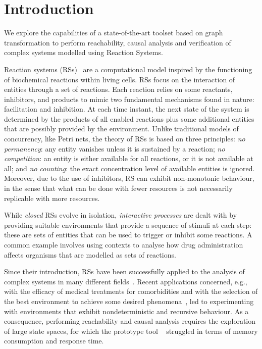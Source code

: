 
\section{Introduction}

We explore the capabilities of a state-of-the-art toolset based on graph transformation to perform reachability, causal analysis and verification of complex systems modelled using Reaction Systems.

Reaction systems (RSs)~\cite{DBLP:journals/fuin/EhrenfeuchtR07} are a computational model inspired by the functioning of biochemical reactions within living cells. 
RSs focus on the interaction of entities through a set of reactions. 
Each reaction relies on some reactants, inhibitors, and products to mimic two fundamental mechanisms found in nature: facilitation and inhibition.
At each time instant, the next state of the system is determined by the products of all enabled reactions plus some additional entities that are possibly provided by the environment.
Unlike traditional models of concurrency, like Petri nets, the theory of RSs is based on three principles: \emph{no permanency}: any entity vanishes unless it is sustained by a reaction; \emph{no competition}: an entity is either available for all reactions, or it is not available at all; and \emph{no counting}: the exact concentration level of available entities is ignored.
Moreover, due to the use of inhibitors, RS can exhibit non-monotonic behaviour, in the sense that what can be done with fewer resources is not necessarily replicable with more resources.

While \emph{closed} RSs evolve in isolation, \emph{interactive processes} are dealt with by providing suitable environments that provide a sequence of stimuli at each step: these are sets of entities that can be used to trigger or inhibit some reactions. A common example involves using contexts to analyse how drug administration affects organisms that are modelled as sets of reactions.

Since their introduction, RSs have been successfully applied to the analysis of complex systems in many different fields~\cite{ABP14,CMMBM12,Az17,OY16,DBLP:journals/ijfcs/EhrenfeuchtMR10,DBLP:journals/ijfcs/EhrenfeuchtMR11}.
Recent applications concerned, e.g., with the efficacy of medical treatments for comorbidities and with the selection of the best environment to achieve some desired phenomena~\cite{DBLP:conf/cmsb/BowlesBBFGM24,datamod2023}, led to experimenting with environments that exhibit nondeterministic and recursive behaviour.
As a consequence, performing reachability and causal analysis requires the exploration of large state spaces, for which the prototype tool \BioResolve~\cite{DBLP:journals/tcs/BrodoBF21} struggled in terms of  memory consumption and response time.
 
